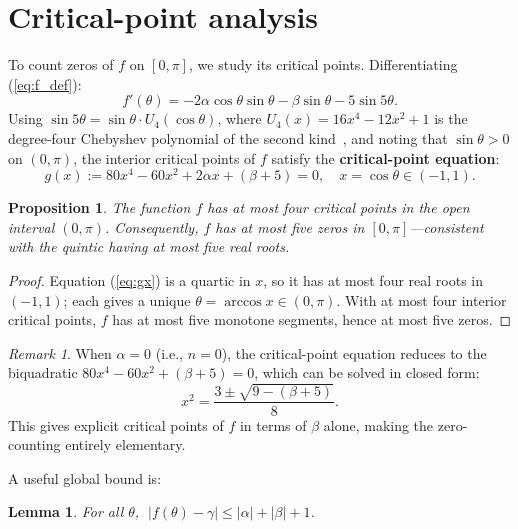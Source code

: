 \documentclass[12pt]{article}
\newtheorem{lemma}[theorem]{Lemma}
\newtheorem{proposition}[theorem]{Proposition}
\theoremstyle{definition}
\theoremstyle{remark}
\newtheorem{remark}[theorem]{Remark}
\begin{document}
\section{Critical-point analysis}

To count zeros of $f$ on $[0,\pi]$, we study its critical points. Differentiating (\ref{eq:f_def}):
\begin{equation}\label{eq:fprime}
f'(\theta) = -2\alpha\cos\theta\sin\theta - \beta\sin\theta - 5\sin 5\theta.
\end{equation}
Using $\sin 5\theta = \sin\theta \cdot U_4(\cos\theta)$, where $U_4(x) = 16x^4 - 12x^2 + 1$ is the degree-four Chebyshev polynomial of the second kind~\cite{Mason2003}, and noting that $\sin\theta > 0$ on $(0,\pi)$, the interior critical points of $f$ satisfy the \textbf{critical-point equation}:
\begin{equation}\label{eq:gx}
g(x) := 80x^4 - 60x^2 + 2\alpha x + (\beta + 5) = 0, \quad x = \cos\theta \in (-1,1).
\end{equation}

\begin{proposition}\label{prop:crit_count}
The function $f$ has at most four critical points in the open interval $(0,\pi)$. Consequently, $f$ has at most five zeros in $[0,\pi]$---consistent with the quintic having at most five real roots.
\end{proposition}

\begin{proof}
Equation (\ref{eq:gx}) is a quartic in $x$, so it has at most four real roots in $(-1,1)$; each gives a unique $\theta = \arccos x \in (0,\pi)$. With at most four interior critical points, $f$ has at most five monotone segments, hence at most five zeros.
\end{proof}

\begin{remark}\label{rem:alpha_zero}
When $\alpha = 0$ (i.e., $n = 0$), the critical-point equation reduces to the biquadratic $80x^4 - 60x^2 + (\beta + 5) = 0$, which can be solved in closed form:
\[
x^2 = \frac{3 \pm \sqrt{9 - (\beta+5)}}{8}.
\]
This gives explicit critical points of $f$ in terms of $\beta$ alone, making the zero-counting entirely elementary.
\end{remark}

A useful global bound is:

\begin{lemma}\label{lem:fbound}
For all $\theta$, $\;|f(\theta) - \gamma| \leq |\alpha| + |\beta| + 1$.
\end{lemma}
\end{document}
